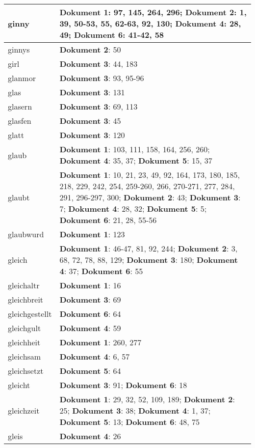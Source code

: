 \documentclass[a5paper]{article}
\begin{document}
\begin{longtable}[l]{|l|p{3in}|}
\hline
ginny & \textbf{Dokument 1}: 97, 145, 264, 296; \textbf{Dokument 2}: 1, 39, 50-53, 55, 62-63, 92, 130; \textbf{Dokument 4}: 28, 49; \textbf{Dokument 6}: 41-42, 58 \\
\hline
ginnys & \textbf{Dokument 2}: 50 \\
\hline
girl & \textbf{Dokument 3}: 44, 183 \\
\hline
glanmor & \textbf{Dokument 3}: 93, 95-96 \\
\hline
glas & \textbf{Dokument 3}: 131 \\
\hline
glasern & \textbf{Dokument 3}: 69, 113 \\
\hline
glasfen & \textbf{Dokument 3}: 45 \\
\hline
glatt & \textbf{Dokument 3}: 120 \\
\hline
glaub & \textbf{Dokument 1}: 103, 111, 158, 164, 256, 260; \textbf{Dokument 4}: 35, 37; \textbf{Dokument 5}: 15, 37 \\
\hline
glaubt & \textbf{Dokument 1}: 10, 21, 23, 49, 92, 164, 173, 180, 185, 218, 229, 242, 254, 259-260, 266, 270-271, 277, 284, 291, 296-297, 300; \textbf{Dokument 2}: 43; \textbf{Dokument 3}: 7; \textbf{Dokument 4}: 28, 32; \textbf{Dokument 5}: 5; \textbf{Dokument 6}: 21, 28, 55-56 \\
\hline
glaubwurd & \textbf{Dokument 1}: 123 \\
\hline
gleich & \textbf{Dokument 1}: 46-47, 81, 92, 244; \textbf{Dokument 2}: 3, 68, 72, 78, 88, 129; \textbf{Dokument 3}: 180; \textbf{Dokument 4}: 37; \textbf{Dokument 6}: 55 \\
\hline
gleichaltr & \textbf{Dokument 1}: 16 \\
\hline
gleichbreit & \textbf{Dokument 3}: 69 \\
\hline
gleichgestellt & \textbf{Dokument 6}: 64 \\
\hline
gleichgult & \textbf{Dokument 4}: 59 \\
\hline
gleichheit & \textbf{Dokument 1}: 260, 277 \\
\hline
gleichsam & \textbf{Dokument 4}: 6, 57 \\
\hline
gleichsetzt & \textbf{Dokument 5}: 64 \\
\hline
gleicht & \textbf{Dokument 3}: 91; \textbf{Dokument 6}: 18 \\
\hline
gleichzeit & \textbf{Dokument 1}: 29, 32, 52, 109, 189; \textbf{Dokument 2}: 25; \textbf{Dokument 3}: 38; \textbf{Dokument 4}: 1, 37; \textbf{Dokument 5}: 13; \textbf{Dokument 6}: 48, 75 \\
\hline
gleis & \textbf{Dokument 4}: 26 \\

\end{longtable}
\end{document}

